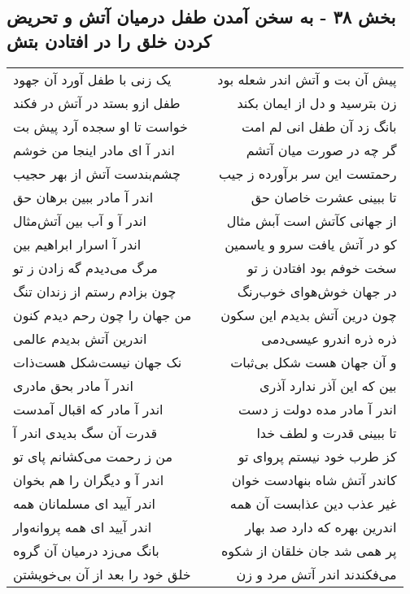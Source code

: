 \begin{center}
\section*{بخش ۳۸ - به سخن آمدن طفل درمیان آتش و تحریض کردن خلق را در افتادن بتش}
\label{sec:sh038}
\begin{longtable}{l p{0.5cm} r}
یک زنی با طفل آورد آن جهود
&&
پیش آن بت و آتش اندر شعله بود
\\
طفل ازو بستد در آتش در فکند
&&
زن بترسید و دل از ایمان بکند
\\
خواست تا او سجده آرد پیش بت
&&
بانگ زد آن طفل انی لم امت
\\
اندر آ ای مادر اینجا من خوشم
&&
گر چه در صورت میان آتشم
\\
چشم‌بندست آتش از بهر حجیب
&&
رحمتست این سر برآورده ز جیب
\\
اندر آ مادر ببین برهان حق
&&
تا ببینی عشرت خاصان حق
\\
اندر آ و آب بین آتش‌مثال
&&
از جهانی کآتش است آبش مثال
\\
اندر آ اسرار ابراهیم بین
&&
کو در آتش یافت سرو و یاسمین
\\
مرگ می‌دیدم گه زادن ز تو
&&
سخت خوفم بود افتادن ز تو
\\
چون بزادم رستم از زندان تنگ
&&
در جهان خوش‌هوای خوب‌رنگ
\\
من جهان را چون رحم دیدم کنون
&&
چون درین آتش بدیدم این سکون
\\
اندرین آتش بدیدم عالمی
&&
ذره ذره اندرو عیسی‌دمی
\\
نک جهان نیست‌شکل هست‌ذات
&&
و آن جهان هست شکل بی‌ثبات
\\
اندر آ مادر بحق مادری
&&
بین که این آذر ندارد آذری
\\
اندر آ مادر که اقبال آمدست
&&
اندر آ مادر مده دولت ز دست
\\
قدرت آن سگ بدیدی اندر آ
&&
تا ببینی قدرت و لطف خدا
\\
من ز رحمت می‌کشانم پای تو
&&
کز طرب خود نیستم پروای تو
\\
اندر آ و دیگران را هم بخوان
&&
کاندر آتش شاه بنهادست خوان
\\
اندر آیید ای مسلمانان همه
&&
غیر عذب دین عذابست آن همه
\\
اندر آیید ای همه پروانه‌وار
&&
اندرین بهره که دارد صد بهار
\\
بانگ می‌زد درمیان آن گروه
&&
پر همی شد جان خلقان از شکوه
\\
خلق خود را بعد از آن بی‌خویشتن
&&
می‌فکندند اندر آتش مرد و زن
\\

\end{longtable}
\end{center}
